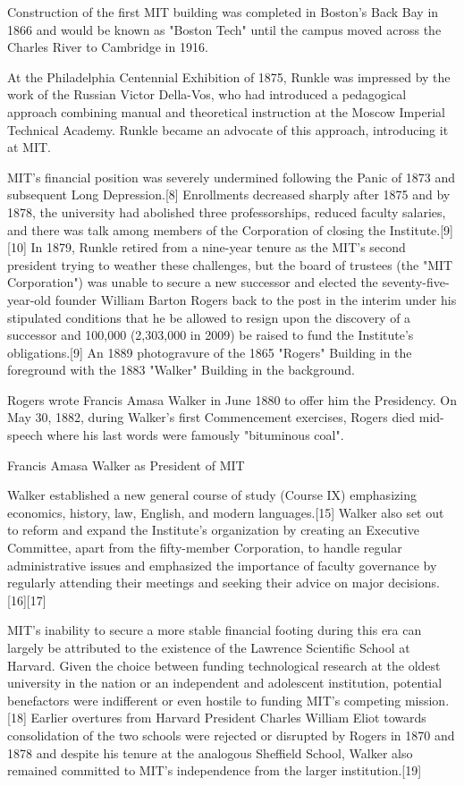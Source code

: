 Construction of the first MIT building was completed in Boston's Back Bay in 1866 and would be known as "Boston Tech" until the campus moved across the Charles River to Cambridge in 1916.

At the Philadelphia Centennial Exhibition of 1875, Runkle was impressed by the work of the Russian Victor Della-Vos, who had introduced a pedagogical approach combining manual and theoretical instruction at the Moscow Imperial Technical Academy. Runkle became an advocate of this approach, introducing it at MIT.

MIT's financial position was severely undermined following the Panic of 1873 and subsequent Long Depression.[8] Enrollments decreased sharply after 1875 and by 1878, the university had abolished three professorships, reduced faculty salaries, and there was talk among members of the Corporation of closing the Institute.[9][10] In 1879, Runkle retired from a nine-year tenure as the MIT's second president trying to weather these challenges, but the board of trustees (the "MIT Corporation") was unable to secure a new successor and elected the seventy-five-year-old founder William Barton Rogers back to the post in the interim under his stipulated conditions that he be allowed to resign upon the discovery of a successor and 100,000 (2,303,000 in 2009) be raised to fund the Institute's obligations.[9]
An 1889 photogravure of the 1865 "Rogers" Building in the foreground with the 1883 "Walker" Building in the background.

Rogers wrote Francis Amasa Walker in June 1880 to offer him the Presidency. On May 30, 1882, during Walker's first Commencement exercises, Rogers died mid-speech where his last words were famously "bituminous coal".

Francis Amasa Walker as President of MIT

Walker established a new general course of study (Course IX) emphasizing economics, history, law, English, and modern languages.[15] Walker also set out to reform and expand the Institute's organization by creating an Executive Committee, apart from the fifty-member Corporation, to handle regular administrative issues and emphasized the importance of faculty governance by regularly attending their meetings and seeking their advice on major decisions.[16][17]

MIT's inability to secure a more stable financial footing during this era can largely be attributed to the existence of the Lawrence Scientific School at Harvard. Given the choice between funding technological research at the oldest university in the nation or an independent and adolescent institution, potential benefactors were indifferent or even hostile to funding MIT's competing mission.[18] Earlier overtures from Harvard President Charles William Eliot towards consolidation of the two schools were rejected or disrupted by Rogers in 1870 and 1878 and despite his tenure at the analogous Sheffield School, Walker also remained committed to MIT's independence from the larger institution.[19]

